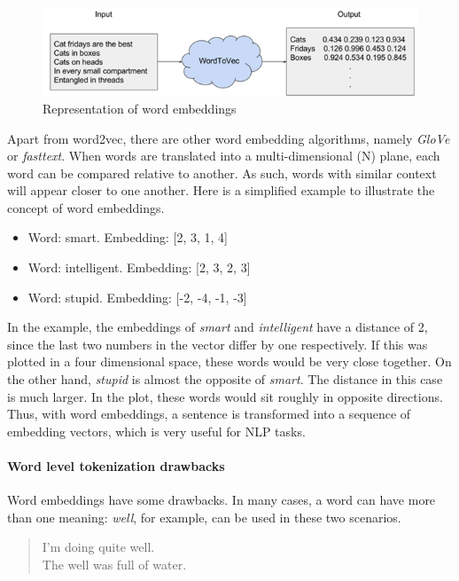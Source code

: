 \begin{figure}[!ht]
    \centering
    \includegraphics[width=14cm]{figures/word_emb.png}
    \caption{Representation of word embeddings}
\end{figure}

Apart from word2vec, there are other word embedding algorithms, namely \textit{GloVe} or \textit{fasttext}. When words are translated into a multi-dimensional (N) plane, each word can be compared relative to another. As such, words with similar context will appear closer to one another. Here is a simplified example to illustrate the concept of word embeddings.

\begin{itemize}
    \item Word: smart. Embedding: [2, 3, 1, 4]
    \item Word: intelligent. Embedding: [2, 3, 2, 3]
    \item Word: stupid. Embedding: [-2, -4, -1, -3]
\end{itemize}

In the example, the embeddings of \emph{smart} and \emph{intelligent} have a distance of 2, since the last two numbers in the vector differ by one respectively. If this was plotted in a four dimensional space, these words would be very close together. On the other hand, \emph{stupid} is almost the opposite of \emph{smart}. The distance in this case is much larger. In the plot, these words would sit roughly in opposite directions. Thus, with word embeddings, a sentence is transformed into a sequence of embedding vectors, which is very useful for NLP tasks.

\paragraph{Word level tokenization drawbacks}

Word embeddings have some drawbacks. In many cases, a word can have more than one meaning: \emph{well}, for example, can be used in these two scenarios.

\begin{quote}
    I'm doing quite well.\\
    The well was full of water.
\end{quote}


